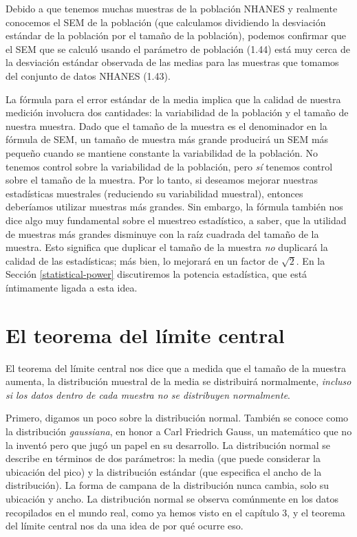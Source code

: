 \documentclass[
  12pt,
]{book}
\theoremstyle{definition}
\theoremstyle{definition}
\theoremstyle{definition}
\theoremstyle{remark}
\begin{document}
Debido a que tenemos muchas muestras de la población NHANES y realmente conocemos el SEM de la población (que calculamos dividiendo la desviación estándar de la población por el tamaño de la población), podemos confirmar que el SEM que se calculó usando el parámetro de población (1.44) está muy cerca de la desviación estándar observada de las medias para las muestras que tomamos del conjunto de datos NHANES (1.43).

La fórmula para el error estándar de la media implica que la calidad de nuestra medición involucra dos cantidades: la variabilidad de la población y el tamaño de nuestra muestra. Dado que el tamaño de la muestra es el denominador en la fórmula de SEM, un tamaño de muestra más grande producirá un SEM más pequeño cuando se mantiene constante la variabilidad de la población. No tenemos control sobre la variabilidad de la población, pero \emph{sí} tenemos control sobre el tamaño de la muestra. Por lo tanto, si deseamos mejorar nuestras estadísticas muestrales (reduciendo su variabilidad muestral), entonces deberíamos utilizar muestras más grandes. Sin embargo, la fórmula también nos dice algo muy fundamental sobre el muestreo estadístico, a saber, que la utilidad de muestras más grandes disminuye con la raíz cuadrada del tamaño de la muestra. Esto significa que duplicar el tamaño de la muestra \emph{no} duplicará la calidad de las estadísticas; más bien, lo mejorará en un factor de \(\sqrt{2}\). En la Sección \ref{statistical-power} discutiremos la potencia estadística, que está íntimamente ligada a esta idea.

\hypertarget{the-central-limit-theorem}{%
\section{El teorema del límite central}\label{the-central-limit-theorem}}

El teorema del límite central nos dice que a medida que el tamaño de la muestra aumenta, la distribución muestral de la media se distribuirá normalmente, \emph{incluso si los datos dentro de cada muestra no se distribuyen normalmente}.

Primero, digamos un poco sobre la distribución normal. También se conoce como la distribución \emph{gaussiana}, en honor a Carl Friedrich Gauss, un matemático que no la inventó pero que jugó un papel en su desarrollo. La distribución normal se describe en términos de dos parámetros: la media (que puede considerar la ubicación del pico) y la distribución estándar (que especifica el ancho de la distribución). La forma de campana de la distribución nunca cambia, solo su ubicación y ancho. La distribución normal se observa comúnmente en los datos recopilados en el mundo real, como ya hemos visto en el capítulo 3, y el teorema del límite central nos da una idea de por qué ocurre eso.
\end{document}
